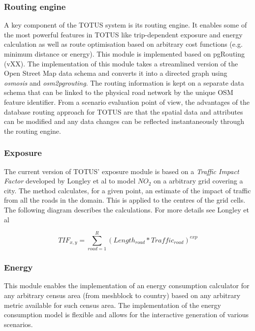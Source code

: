 
\subsubsection*{Routing engine}
A key component of the TOTUS system is its routing engine. It enables some of the most powerful features in TOTUS like trip-dependent exposure and energy calculation as well as route optimisation based on arbitrary cost functions (e.g. minimum distance or energy). This module is implemented based on pgRouting (vXX)\cite{dummy_temp}. The implementation of this module takes a streamlined version of the Open Street Map \cite{dummy_temp} data schema and converts it into a directed graph using \textit{osmosis}\cite{dummy_temp} and \textit{osm2pgrouting}\cite{dummy_temp}. The routing information is kept on a separate data schema that can be linked to the physical road network by the unique OSM feature identifier. From a scenario evaluation point of view, the advantages of the database routing approach for TOTUS are that the spatial data and attributes can be modified and any data changes can be reflected instantaneously through the routing engine. 

\subsubsection*{Exposure}
The current version of TOTUS' exposure module is based on a \textit{Traffic Impact Factor} developed by Longley et al\cite{dummy_temp} to model $NO_2$ on a arbitrary grid covering a city. The method calculates, for a given point, an estimate of the impact of traffic from all the roads in the domain. This is applied to the centres of the grid cells. The following diagram describes the calculations. For more details see Longley et al\cite{dummy_temp}

\begin{equation}
TIF_{x,y} = \sum_{road=1}^{R}{(Length_{road}*Traffic_{road})^{exp}}
\end{equation}

\subsubsection*{Energy}

This module enables the implementation of an energy consumption calculator for any arbitrary census area (from meshblock to country) based on any arbitrary metric available for such census area. The implementation of the energy consumption model is flexible and allows for the interactive generation of various scenarios. 

